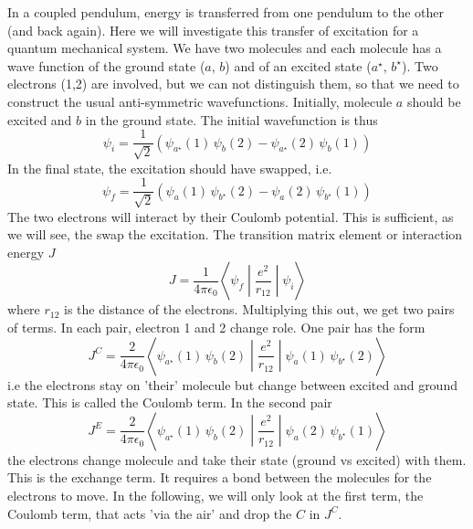 In a coupled pendulum, energy is transferred from one pendulum to the other (and back again). Here we will investigate this transfer of excitation for a quantum mechanical system. We have two molecules and each molecule has a wave function of the ground state ($a$, $b$) and of an excited state ($a^\star$, $b^\star$). Two electrons (1,2) are involved, but we can not distinguish them, so that we need to construct the usual anti-symmetric wavefunctions. Initially, molecule $a$ should be excited and $b$ in the ground state. The initial wavefunction is thus
\begin{equation}
   \psi_i = \frac{1}{\sqrt{2}} \left( \psi_{a^\star}(1) \,  \psi_{b}(2) -   \psi_{a^\star}(2) \,  \psi_{b}(1)\right) 
\end{equation}
In the final state, the excitation should have swapped, i.e.
\begin{equation}
   \psi_f = \frac{1}{\sqrt{2}} \left( \psi_{a}(1) \,  \psi_{b^\star}(2) -   \psi_{a}(2) \,  \psi_{b^\star}(1)\right) 
\end{equation}
The two electrons will interact by their Coulomb potential. This is sufficient, as we will see, the swap the excitation. The transition matrix element or interaction energy $J$
\begin{equation}
   J = \frac{1}{4 \pi \epsilon_0} \left\langle \psi_f \middle| \frac{e^2}{r_{12}} \middle| \psi_i \right\rangle
\end{equation}
where $r_{12}$ is the distance of the electrons. Multiplying this out, we get two pairs of terms. In each pair, electron 1 and 2 change role. One pair has the form
\begin{equation}
   J^C = \frac{2}{4 \pi \epsilon_0}  \left\langle  \psi_{a^\star}(1) \,  \psi_{b}(2)\middle| \frac{e^2}{r_{12}} \middle|  \psi_{a}(1) \,  \psi_{b^\star}(2)\right\rangle
\end{equation} 
i.e the electrons stay on 'their' molecule but change between excited and ground state. This is called the Coulomb term. In the second pair
\begin{equation}
   J^E = \frac{2}{4 \pi \epsilon_0}  \left\langle \psi_{a^\star}(1) \,  \psi_{b}(2) \middle| \frac{e^2}{r_{12}} \middle|  \psi_{a}(2) \,  \psi_{b^\star}(1) \right\rangle
\end{equation} 
%
the electrons change molecule and take their state (ground vs excited) with them. This is the exchange term. It requires a bond between the molecules for the electrons to move. In the following, we will only look at the first term, the Coulomb term, that acts 'via the air' and drop the $C$ in $J^C$.





